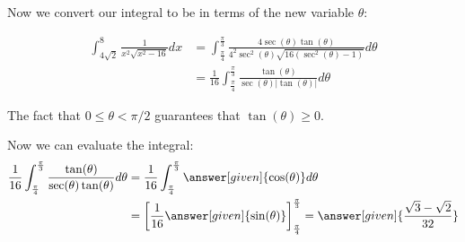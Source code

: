\documentclass{ximera}
\begin{document}
\begin{example}
\begin{explanation}
Now we convert our integral to be in terms of the new variable $\theta$:

    \begin{align*}
      \int_{4\sqrt{2}}^{8} \frac{1}{x^{2}\sqrt{x^{2}-16}} dx &= \int_{\frac{\pi}{4}}^{\frac{\pi}{3}} \frac{ 4\sec(\theta)\tan(\theta)}{ 4^{2}\sec^{2}(\theta) \sqrt{ 16(\sec^{2}(\theta)-1) }} d\theta \\
      &=\frac{1}{16}\int_{\frac{\pi}{4}}^{\frac{\pi}{3}} \frac{\tan(\theta)}{\sec(\theta) |\tan(\theta)|}  d\theta
          \end{align*}

The fact that $0\leq \theta < \pi/2$ guarantees that $\tan(\theta) \geq 0$. 
 
   Now we can evaluate the integral:
    \begin{align*}
     \frac{1}{16}\int_{\frac{\pi}{4}}^{\frac{\pi}{3}} \frac{\tan(\theta)}{\sec(\theta) \tan(\theta)}  d\theta &= \frac{1}{16} \int_{\frac{\pi}{4}}^{\frac{\pi}{3}} \answer[given]{\cos(\theta)}  d\theta\\
      &= \bigg[\frac{1}{16}\answer[given]{\sin(\theta)}\bigg]_{\frac{\pi}{4}}^{\frac{\pi}{3}}= \answer[given]{\frac{\sqrt{3}-\sqrt{2}}{32}}
         \end{align*}

\end{explanation}
\end{example}
\end{document}
